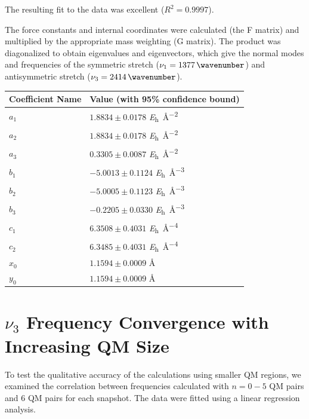 The resulting fit to the data was excellent (\(R^2 = 0.9997\)).

The force constants and internal coordinates were calculated (the F matrix) and multiplied by the appropriate mass weighting (G matrix). The product was diagonalized to obtain eigenvalues and eigenvectors, which give the normal modes and frequencies of the symmetric stretch (\(\nu_{1} = \SI{1377}{\wavenumber}\)) and antisymmetric stretch (\(\nu_{3} = \SI{2414}{\wavenumber}\)).

\begin{table}
  \centering
  \caption{Best fit parameters for DVR representation of the gas phase  potential energy surface.}
  \label{paper_02:tab:S5}
  \begin{longtable}[]{@{}ll@{}}
    \toprule
    Coefficient Name & Value (with 95\% confidence bound)\tabularnewline
    \midrule
    \endhead
    \(a_1\) & \(1.8834 \pm 0.0178\) \si{\hartree\per\angstrom\squared}\tabularnewline
    \(a_2\) & \(1.8834 \pm 0.0178\) \si{\hartree\per\angstrom\squared}\tabularnewline
    \(a_3\) & \(0.3305 \pm 0.0087\) \si{\hartree\per\angstrom\squared}\tabularnewline
    \(b_1\) & \(-5.0013 \pm 0.1124\) \si{\hartree\per\angstrom\cubed}\tabularnewline
    \(b_2\) & \(-5.0005 \pm 0.1123\) \si{\hartree\per\angstrom\cubed}\tabularnewline
    \(b_3\) & \(-0.2205 \pm 0.0330\) \si{\hartree\per\angstrom\cubed}\tabularnewline
    \(c_1\) & \(6.3508 \pm 0.4031\) \si{\hartree\per\angstrom\tothe{4}}\tabularnewline
    \(c_2\) & \(6.3485 \pm 0.4031\) \si{\hartree\per\angstrom\tothe{4}}\tabularnewline
    \(x_0\) & \(1.1594 \pm 0.0009\) \si{\angstrom}\tabularnewline
    \(y_0\) & \(1.1594 \pm 0.0009\) \si{\angstrom}\tabularnewline
    \bottomrule
  \end{longtable}
\end{table}

\section{\(\nu_{3}\) Frequency Convergence with Increasing QM Size}
\label{paper_02:sec:SVI}

To test the qualitative accuracy of the calculations using smaller QM regions, we examined the correlation between frequencies calculated with \(n = 0-5\) QM pairs and \num{6} QM pairs for each snapshot. The data were fitted using a linear regression analysis.

